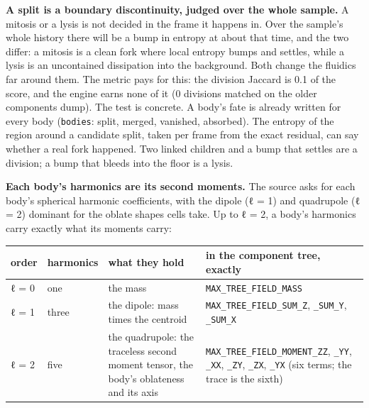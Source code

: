 \textbf{A split is a boundary discontinuity, judged over the whole sample.} A mitosis or a lysis is not decided in the frame it happens in. Over the sample's whole history there will be a bump in entropy at about that time, and the two differ: a mitosis is a clean fork where local entropy bumps and settles, while a lysis is an uncontained dissipation into the background. Both change the fluidics far around them. The metric pays for this: the division Jaccard is 0.1 of the score, and the engine earns none of it (0 divisions matched on the older components dump). The test is concrete. A body's fate is already written for every body (\texttt{bodies}: split, merged, vanished, absorbed). The entropy of the region around a candidate split, taken per frame from the exact residual, can say whether a real fork happened. Two linked children and a bump that settles are a division; a bump that bleeds into the floor is a lysis.

\textbf{Each body's harmonics are its second moments.} The source asks for each body's spherical harmonic coefficients, with the dipole (ℓ = 1) and quadrupole (ℓ = 2) dominant for the oblate shapes cells take. Up to ℓ = 2, a body's harmonics carry exactly what its moments carry:

{\footnotesize
\setlength{\tabcolsep}{6pt}
\begin{longtable}{>{\RaggedRight\arraybackslash}p{}>{\RaggedRight\arraybackslash}p{}>{\RaggedRight\arraybackslash}p{}>{\RaggedRight\arraybackslash}p{}}
\toprule
order & harmonics & what they hold & in the component tree, exactly \\
\midrule
\endhead
ℓ = 0 & one & the mass & \texttt{MAX\_\allowbreak{}TREE\_\allowbreak{}FIELD\_\allowbreak{}MASS} \\
ℓ = 1 & three & the dipole: mass times the centroid & \texttt{MAX\_\allowbreak{}TREE\_\allowbreak{}FIELD\_\allowbreak{}SUM\_\allowbreak{}Z}, \texttt{\_\allowbreak{}SUM\_\allowbreak{}Y}, \texttt{\_\allowbreak{}SUM\_\allowbreak{}X} \\
ℓ = 2 & five & the quadrupole: the traceless second moment tensor, the body's oblateness and its axis & \texttt{MAX\_\allowbreak{}TREE\_\allowbreak{}FIELD\_\allowbreak{}MOMENT\_\allowbreak{}ZZ}, \texttt{\_\allowbreak{}YY}, \texttt{\_\allowbreak{}XX}, \texttt{\_\allowbreak{}ZY}, \texttt{\_\allowbreak{}ZX}, \texttt{\_\allowbreak{}YX} (six terms; the trace is the sixth) \\
\bottomrule
\end{longtable}
}

